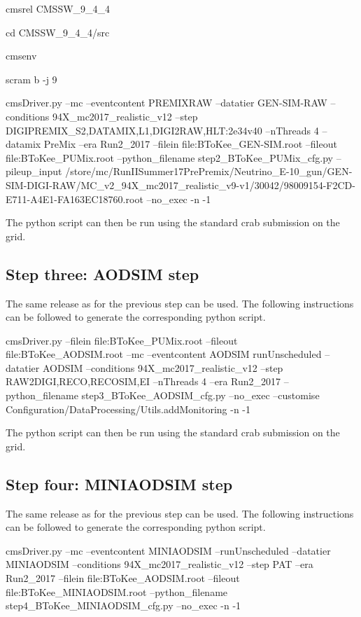 \documentclass[a4paper,11pt]{article}
\begin{document}
\bigbreak
cmsrel CMSSW\_9\_4\_4

cd CMSSW\_9\_4\_4/src

cmsenv

scram b -j 9

cmsDriver.py --mc --eventcontent PREMIXRAW --datatier GEN-SIM-RAW --conditions 94X\_mc2017\_realistic\_v12 --step DIGIPREMIX\_S2,DATAMIX,L1,DIGI2RAW,HLT:2e34v40 --nThreads 4 --datamix PreMix --era Run2\_2017 --filein file:BToKee\_GEN-SIM.root --fileout file:BToKee\_PUMix.root --python\_filename step2\_BToKee\_PUMix\_cfg.py --pileup\_input /store/mc/RunIISummer17PrePremix/Neutrino\_E-10\_gun/GEN-SIM-DIGI-RAW/MC\_v2\_94X\_mc2017\_realistic\_v9-v1/30042/98009154-F2CD-E711-A4E1-FA163EC18760.root --no\_exec -n -1
\bigbreak

The python script can then be run using the standard crab submission on the grid.


\subsection{Step three: AODSIM step}

The same release as for the previous step can be used. The following instructions can be followed to generate the corresponding python script.

\bigbreak
cmsDriver.py --filein file:BToKee\_PUMix.root --fileout file:BToKee\_AODSIM.root --mc --eventcontent AODSIM runUnscheduled --datatier AODSIM --conditions 94X\_mc2017\_realistic\_v12 --step RAW2DIGI,RECO,RECOSIM,EI --nThreads 4 --era Run2\_2017 --python\_filename step3\_BToKee\_AODSIM\_cfg.py --no\_exec --customise Configuration/DataProcessing/Utils.addMonitoring -n -1
\bigbreak

The python script can then be run using the standard crab submission on the grid.


\subsection{Step four: MINIAODSIM step}

The same release as for the previous step can be used. The following instructions can be followed to generate the corresponding python script.

\bigbreak
cmsDriver.py --mc --eventcontent MINIAODSIM --runUnscheduled --datatier MINIAODSIM --conditions 94X\_mc2017\_realistic\_v12 --step PAT --era Run2\_2017 --filein file:BToKee\_AODSIM.root --fileout file:BToKee\_MINIAODSIM.root --python\_filename step4\_BToKee\_MINIAODSIM\_cfg.py --no\_exec -n -1
\bigbreak
\end{document}
